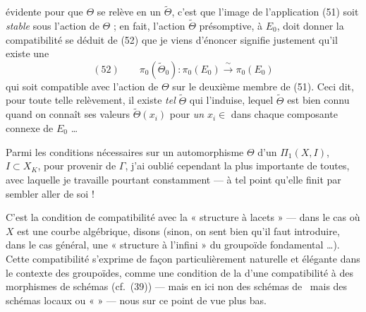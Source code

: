\documentclass[11pt,a4paper]{article}
\begin{document}
évidente pour que $\Theta$ se relève en un $\tilde{\Theta}$, c'est que l'image de l'application (51) soit \textit{stable} sous l'action de $\Theta$ ; en fait, l'action $\tilde{\Theta}$ présomptive,  à $E_0$, doit donner  \struck{\ill{} \ill{}} la compatibilité  se déduit de (52) \struck{\ill{}}   \struck{\ill{}} que je viens d'énoncer signifie justement qu'il existe une \struck{\ill{}} 
\[
  (52) \qquad \pi_0(\tilde{\Theta}_0) : \pi_0(E_0) \xrightarrow{\;\sim\;} \pi_0(E_0)
\]
 qui soit compatible avec l'action de $\Theta$ sur le deuxième membre de (51). Ceci dit, pour toute telle relèvement, il existe \textit{tel} \ill{} $\tilde{\Theta}$ qui l'induise,  lequel $\tilde{\Theta}$ est bien connu quand on connaît ses valeurs $\tilde{\Theta}(x_i)$ \struck{\ill{}} pour \textit{un} $x_i \in$ \struck{\ill{}}  dans chaque composante connexe de $E_0$ \ldots
{}

Parmi les conditions nécessaires  sur un automorphisme $\Theta$ d'un $\hat{\Pi}_1(X, I)$, $I \subset X_K$, pour provenir de $\Gamma$, j'ai oublié cependant la plus importante de toutes, avec laquelle je travaille pourtant constamment --- à tel point qu'elle finit par sembler aller de soi !

C'est la condition de compatibilité avec la « structure à lacets » --- dans le cas où $X$ est une courbe algébrique, disons (sinon, on sent bien qu'il faut introduire, dans le cas général, une « structure à l'infini » du groupoïde fondamental \ldots). Cette compatibilité  s'exprime de façon particulièrement naturelle et élégante dans le contexte des groupoïdes, comme une condition de la  d'une compatibilité à des morphismes de schémas (cf.\ (39)) --- mais en  ici non des schémas de \ mais des schémas locaux  ou «  »  --- nous  sur ce point de vue plus bas.
\end{document}

